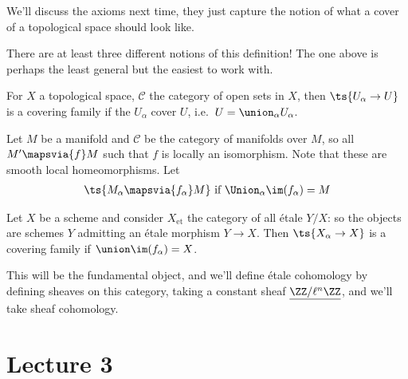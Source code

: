 We'll discuss the axioms next time, they just capture the notion of what
a cover of a topological space should look like.

\begin{warnings}

There are at least three different notions of this definition! The one
above is perhaps the least general but the easiest to work with.

\end{warnings}

\begin{example}[?]

For \(X\) a topological space, \(\mathcal{C}\) the category of open sets
in \(X\), then \(\ts{U_\alpha\to U}\) is a covering family if the
\(U_\alpha\) cover \(U\), i.e.~\(U = \union_\alpha U_\alpha\).

\end{example}

\begin{example}

Let \(M\) be a manifold and \(\mathcal{C}\) be the category of manifolds
over \(M\), so all \(M' \mapsvia{f} M\) such that \(f\) is locally an
isomorphism. Note that these are smooth local homeomorphisms. Let
\begin{align*}
\ts{M_\alpha \mapsvia{f_\alpha} M} \text{ if } \Union_\alpha \im (f_\alpha) = M
\end{align*}

\end{example}

\begin{example}

Let \(X\) be a scheme and consider \(X_{\text{et}}\) the category of all
étale \(Y/X\): so the objects are schemes \(Y\) admitting an étale
morphism \(Y\to X\). Then \(\ts{X_\alpha\to X}\) is a covering family if
\(\union \im (f_\alpha) = X\).

\end{example}

This will be the fundamental object, and we'll define étale cohomology
by defining sheaves on this category, taking a constant sheaf
\(\underline{\ZZ/\ell^n\ZZ}\), and we'll take sheaf cohomology.

\hypertarget{lecture-3}{%
\section{Lecture 3}\label{lecture-3}}

